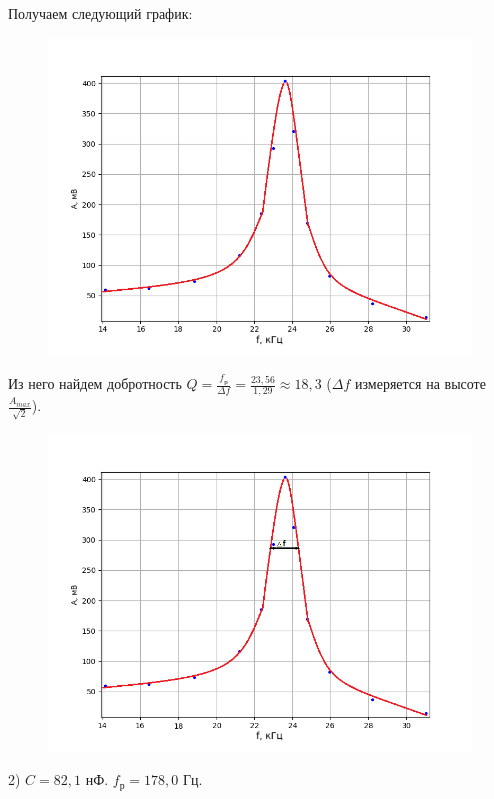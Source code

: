 \documentclass[a4paper,12pt]{article} %
\begin{document}
Получаем следующий график:

\begin{figure}[h!]
	\centering
	\includegraphics[scale=0.85]{Рез1.png}
\end{figure}
\newpage
Из него найдем добротность $Q = \frac{f_{\text{р}}}{\Delta f} = \frac{23,56}{1,29} \approx 18,3$ ($\Delta f$ измеряется на высоте $\frac{A_{max}}{\sqrt{2}}$).

\begin{figure}[h!]
	\centering
	\includegraphics[scale=0.85]{Рез1Добр.png}
\end{figure}

2) $C = 82,1$ нФ. $f_{\text{р}} = 178,0$ Гц.
\end{document}
